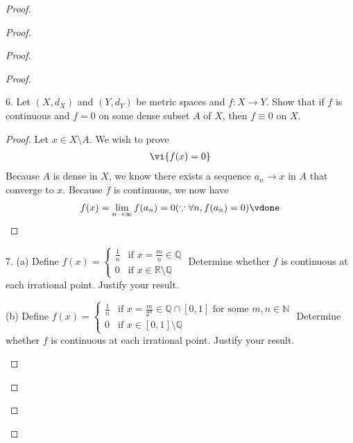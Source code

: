 \documentclass{report}
\begin{document}
\begin{proof}
\begin{proof}
\begin{proof}
\begin{proof}
\begin{question}{}{}

6. Let \( (X, d_X) \) and \( (Y, d_Y) \) be metric spaces and \( f : X \to Y \). Show that if \( f \) is continuous and \( f = 0 \) on some dense subset \( A \) of \( X \), then \( f \equiv 0 \) on \( X \).
\end{question}
\begin{proof}
Let $x\in X\setminus A$. We wish to prove 
\begin{align*}
\vi{f(x)=0}
\end{align*}
Because $A$ is dense in  $X$, we know there exists a sequence  $a_n\to x$ in $A$ that converge to $x$.  Because $f$ is continuous, we now have 
 \begin{align*}
f(x)=\lim_{n\to\infty}f(a_n)=0(\because \forall n,f(a_n)=0 )\vdone
\end{align*}
\end{proof}
\begin{question}{}{}

7. (a) Define \( f(x) = \begin{cases} 
\frac{1}{n} & \text{if } x = \frac{m}{n} \in \mathbb{Q} \\
0 & \text{if } x \in \mathbb{R} \setminus \mathbb{Q} 
\end{cases} \)
Determine whether \( f \) is continuous at each irrational point. Justify your result.

(b) Define \( f(x) = \begin{cases} 
\frac{1}{n} & \text{if } x = \frac{m}{2^n} \in \mathbb{Q} \cap [0, 1] \text{ for some } m, n \in \mathbb{N} \\
0 & \text{if } x \in [0, 1] \setminus \mathbb{Q} 
\end{cases} \)
Determine whether \( f \) is continuous at each irrational point. Justify your result.


\end{question}
\end{proof}
\end{proof}
\end{proof}
\end{proof}
\end{document}
